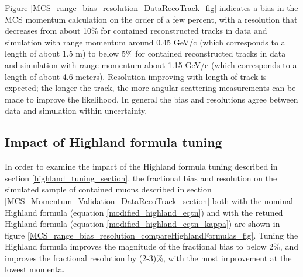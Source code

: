 \documentclass[a4paper,11pt]{article}
\begin{document}
Figure \ref{MCS_range_bias_resolution_DataRecoTrack_fig} indicates a bias in the MCS momentum calculation on the order of a few percent, with a resolution that decreases from about 10\% for contained reconstructed tracks in data and simulation with range momentum around 0.45 GeV/c (which corresponds to a length of about 1.5 m) to below 5\% for contained reconstructed tracks in data and simulation with range momentum about 1.15 GeV/c (which corresponds to a length of about 4.6 meters). Resolution improving with length of track is expected; the longer the track, the more angular scattering measurements can be made to improve the likelihood. In general the bias and resolutions agree between data and simulation within uncertainty.\\

\subsection{Impact of Highland formula tuning}\label{highland_formula_tuning_impact_section}

In order to examine the impact of the Highland formula tuning described in section \ref{highland_tuning_section}, the fractional bias and resolution on the simulated sample of contained muons described in section \ref{MCS_Momentum_Validation_DataRecoTrack_section} both with the nominal Highland formula (equation \ref{modified_highland_eqtn}) and with the retuned Highland formula (equation \ref{modified_highland_eqtn_kappa}) are shown in figure \ref{MCS_range_bias_resolution_compareHighlandFormulas_fig}. Tuning the Highland formula improves the magnitude of the fractional bias to below 2\%, and improves the fractional resolution by (2-3)\%, with the most improvement at the lowest momenta.
\end{document}
